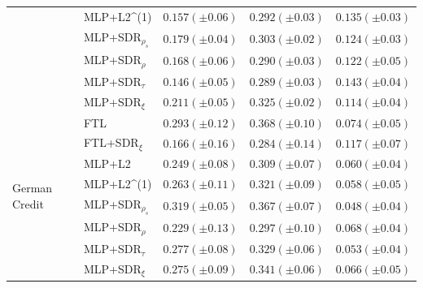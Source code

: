 \begin{tabular}{lllll}
 & MLP+L2^{(1)} & $0.157 (\pm0.06)$ & $0.292 (\pm0.03)$ & $0.135 (\pm0.03)$ \\
 & MLP+SDR$_{\rho_s}$ & $0.179 (\pm0.04)$ & $0.303 (\pm0.02)$ & $0.124 (\pm0.03)$ \\
 & MLP+SDR$_{\rho}$ & $0.168 (\pm0.06)$ & $0.290 (\pm0.03)$ & $0.122 (\pm0.05)$ \\
 & MLP+SDR$_{\tau}$ & $0.146 (\pm0.05)$ & $0.289 (\pm0.03)$ & $0.143 (\pm0.04)$ \\
 & MLP+SDR$_{\xi}$ & $0.211 (\pm0.05)$ & $0.325 (\pm0.02)$ & $0.114 (\pm0.04)$ \\
\cline{1-5}
\multirow[t]{8}{*}{German Credit} & FTL & $0.293 (\pm0.12)$ & $0.368 (\pm0.10)$ & $0.074 (\pm0.05)$ \\
 & FTL+SDR$_{\xi}$ & $0.166 (\pm0.16)$ & $0.284 (\pm0.14)$ & $0.117 (\pm0.07)$ \\
 & MLP+L2 & $0.249 (\pm0.08)$ & $0.309 (\pm0.07)$ & $0.060 (\pm0.04)$ \\
 & MLP+L2^{(1)} & $0.263 (\pm0.11)$ & $0.321 (\pm0.09)$ & $0.058 (\pm0.05)$ \\
 & MLP+SDR$_{\rho_s}$ & $0.319 (\pm0.05)$ & $0.367 (\pm0.07)$ & $0.048 (\pm0.04)$ \\
 & MLP+SDR$_{\rho}$ & $0.229 (\pm0.13)$ & $0.297 (\pm0.10)$ & $0.068 (\pm0.04)$ \\
 & MLP+SDR$_{\tau}$ & $0.277 (\pm0.08)$ & $0.329 (\pm0.06)$ & $0.053 (\pm0.04)$ \\
 & MLP+SDR$_{\xi}$ & $0.275 (\pm0.09)$ & $0.341 (\pm0.06)$ & $0.066 (\pm0.05)$ \\
\cline{1-5}
\bottomrule
\end{tabular}
